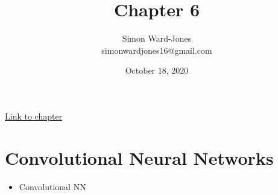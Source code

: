 \documentclass[12pt,notitlepage]{article}
\begin{document}


\title{\Large{\textbf{Chapter 6}}}
\date{October 18, 2020}
\author{Simon Ward-Jones\\simonwardjones16@gmail.com}

\maketitle
\href{https://d2l.ai/chapter_convolutional-neural-networks/index.html}{Link to chapter}

\section{Convolutional Neural Networks}
\begin{itemize}
    \item Convolutional NN
\end{itemize}

\vfill

\nocite{zhang2020dive}
\end{document}
